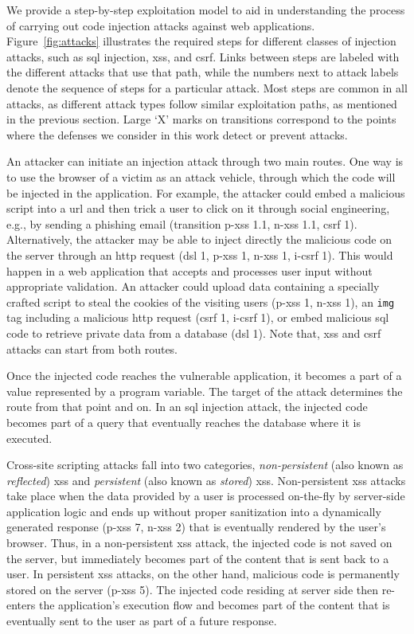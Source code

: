 \documentclass[10pt,journal,compsoc]{IEEEtran}
\begin{document}
We provide a step-by-step exploitation model to aid in understanding the process
of carrying out code injection attacks against web
applications. Figure~\ref{fig:attacks} illustrates the required steps for
different classes of injection attacks,
such as {\sc sql} injection, {\sc xss}, and {\sc csrf}. Links between steps are
labeled with the different attacks that use that path, while the
numbers next to attack labels denote the sequence of steps for a
particular attack. Most steps are common in all attacks, as different attack
types follow similar exploitation paths, as mentioned in
the previous section. Large `X' marks on transitions correspond to the
points where the defenses we consider in this work detect or prevent attacks.

An attacker can initiate an injection attack through two main routes.
One way is to use the browser of a victim as an attack
vehicle, through which the code will be injected in the application.
For example, the attacker could embed a malicious script into a {\sc
  url} and then trick a user to click on it through social
engineering, e.g., by sending a phishing email (transition {\sc p-xss} 1.1, {\sc
  n-xss} 1.1, {\sc csrf} 1). Alternatively, the attacker may be able
to inject directly the malicious code on the server through an {\sc http} request
({\sc dsl} 1, {\sc p-xss} 1, {\sc n-xss} 1, {\sc i-csrf} 1). This would happen
in a web application that accepts and processes user input
without appropriate validation. An attacker could upload data
containing a specially crafted script
to steal the cookies of the visiting users ({\sc p-xss} 1, {\sc n-xss} 1),
an {\tt img} tag including a malicious {\sc http} request ({\sc csrf 1}, {\sc
i-csrf 1}),
or embed malicious
{\sc sql} code to retrieve private data from a database ({\sc dsl} 1).
Note that, {\sc xss} and {\sc csrf} attacks can start from both routes.

Once the injected code reaches the vulnerable application, it becomes
a part of a value represented by a program variable. The target of the
attack determines the route from that point and on. In an {\sc sql} injection
attack, the injected code becomes part of a query that
eventually reaches the database where it is executed.

Cross-site scripting attacks fall into two categories, {\it non-persistent}
(also known as \emph{reflected}) {\sc xss}
and {\it persistent} (also known as \emph{stored}) {\sc xss}.
Non-persistent {\sc xss} attacks take place when the
data provided by a user is processed on-the-fly
by server-side application logic and ends up without proper sanitization
into a dynamically generated response ({\sc p-xss} 7, {\sc n-xss} 2)
that is eventually rendered by the user's browser.
Thus, in a non-persistent {\sc xss} attack, the injected code
is not saved on the server, but immediately becomes part of the
content that is sent back to a user.
In persistent {\sc xss} attacks, on the other hand,
malicious code is permanently stored on the server ({\sc p-xss} 5).
The injected code residing at server side then re-enters the
application's execution flow and becomes part of the content that is
eventually sent to the user as part of a future response.
\end{document}
